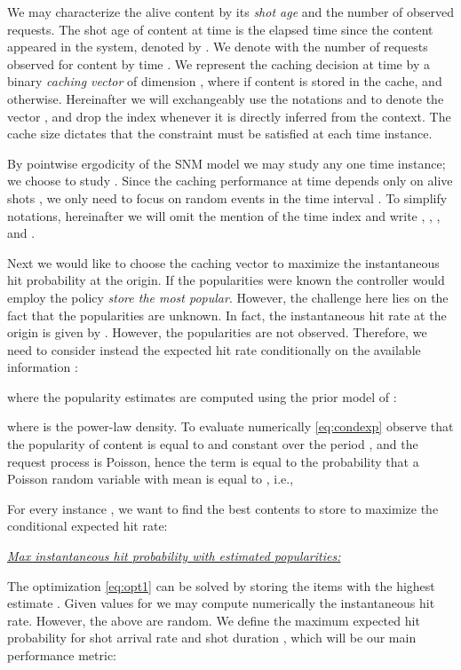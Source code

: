 \documentclass[10pt, conference, letterpaper]{IEEEtran}
\begin{document}
We may characterize the alive content  by its \emph{shot age} and the number of observed requests.
The shot age of content  at time  is the elapsed time since the content appeared in the system, denoted by . 
	We denote with  the number of requests observed for content  by time .
We represent the caching decision at time  by a binary \emph{caching vector}  of dimension , where  if content  is stored in the cache, and  otherwise. 
		Hereinafter we will exchangeably use the notations  and  to denote the vector , and 
	drop the index whenever it is directly inferred from the context.
		The cache size  dictates that the constraint  must be satisfied at each time instance.
	
By pointwise ergodicity of the SNM model  we may study any one time instance; we choose to study .
	Since the caching performance at time  depends only on alive shots , we only need to focus on random events in the time interval .
	To simplify notations, hereinafter we will omit the mention of the time index  and write , , , and .



Next we would like to choose the caching vector  to maximize the instantaneous hit probability at the origin. 
If the popularities were known the controller would employ the policy \emph{store the most popular}. However, the challenge here lies on the fact that the popularities  are unknown. 
In fact, the instantaneous hit rate at the origin is given by . However, the popularities  are not observed. Therefore, we need to consider instead the expected hit rate conditionally on the available information :

where the popularity estimates are computed using the prior model of :

where  is the power-law density. To evaluate numerically \eqref{eq:condexp} observe that the popularity of content  is equal to  and constant  over the period , and the request process is Poisson, hence the term  is equal to the probability that a Poisson random variable with mean  is equal to , i.e.,

For every instance , we want to find the best contents to store to maximize the conditional expected hit rate:

\vspace{0.1in}

\noindent \underline{\emph{Max instantaneous hit probability with estimated popularities:}}

The optimization \eqref{eq:opt1} can be solved by storing the  items with the highest estimate . 
Given values for  we may compute numerically the instantaneous hit rate. However, the above are random. We define the maximum expected hit probability  for shot arrival rate  and shot duration , which will be our main performance metric:
\end{document}

